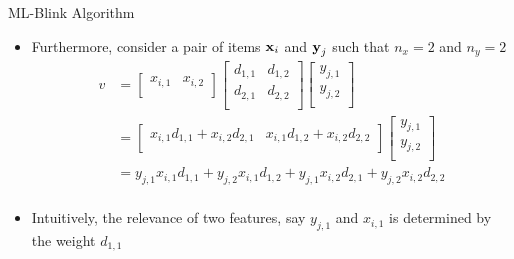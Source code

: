 \begin{frame}{ML-Blink Algorithm}
    \begin{itemize}
        \item Furthermore, consider a pair of items $\boldsymbol{\mathbf{x}}_i$ and $\boldsymbol{\mathbf{y}}_j$ such that $n_x = 2$ and $n_y = 2$
            \begin{equation} \label{eq:v-flesh-out:short}
                \begin{split} 
                    v &= 
                        \begin{bmatrix}
                            x_{i,1} & x_{i,2} \\
                        \end{bmatrix}
                        \begin{bmatrix}
                            d_{1,1} & d_{1,2} \\
                            d_{2,1} & d_{2,2} \\
                        \end{bmatrix}
                        \begin{bmatrix}
                            y_{j,1} \\
                            y_{j,2} \\
                        \end{bmatrix} \\
                    &=
                        \begin{bmatrix}
                            x_{i,1}d_{1,1} + x_{i,2}d_{2,1} & x_{i,1}d_{1,2} + x_{i,2}d_{2,2} \\
                        \end{bmatrix}    
                        \begin{bmatrix}
                            y_{j,1} \\
                            y_{j,2} \\
                        \end{bmatrix} \\
                    &= 
                        y_{j,1}x_{i,1}d_{1,1} + y_{j,2}x_{i,1}d_{1,2} + y_{j,1}x_{i,2}d_{2,1} + y_{j,2}x_{i,2}d_{2,2} \\
                \end{split}
            \end{equation}
        \item Intuitively, the relevance of two features, say $y_{j,1}$ and $x_{i,1}$ is determined by the weight $d_{1,1}$
    \end{itemize}
\end{frame}

